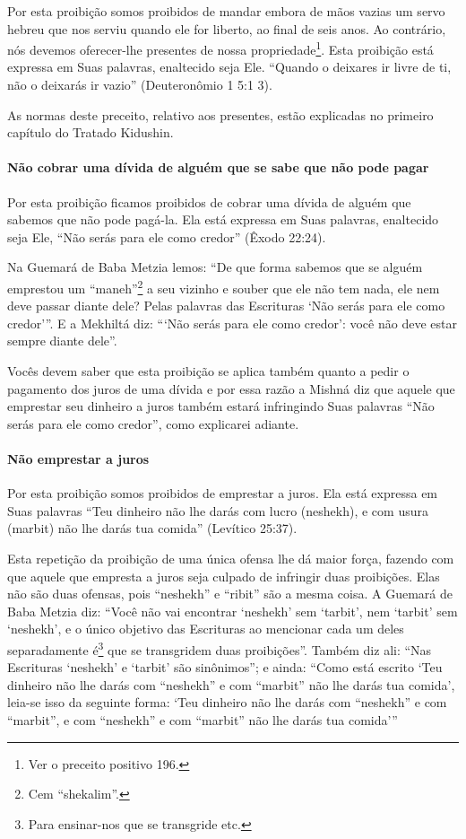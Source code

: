 Por esta proibição somos proibidos de mandar embora de mãos vazias um
servo hebreu que nos serviu quando ele for liberto, ao final de seis
anos. Ao contrário, nós devemos oferecer-lhe presentes de nossa
propriedade\footnote{Ver o preceito positivo 196.}. Esta proibição está expressa em Suas
palavras, enaltecido seja Ele. ``Quando o deixares ir livre de ti, não
o deixarás ir vazio'' (Deuteronômio 1 5:1 3).

As normas deste preceito, relativo aos presentes, estão explicadas no
primeiro capítulo do Tratado Kidushin.

\paragraph{Não cobrar uma dívida de alguém que se sabe que não pode pagar}

Por esta proibição ficamos proibidos de cobrar uma dívida de alguém que
sabemos que não pode pagá-la. Ela está expressa em Suas palavras,
enaltecido seja Ele, ``Não serás para ele como credor'' (Êxodo 22:24).

Na Guemará de Baba Metzia lemos: ``De que forma sabemos que se alguém
emprestou um ``maneh''\footnote{Cem ``shekalim''.} a seu vizinho e souber que
ele não tem nada, ele nem deve passar diante dele? Pelas palavras das
Escrituras `Não serás para ele como credor'''. E a Mekhiltá diz: ```Não
serás para ele como credor': você não deve estar sempre diante dele''.

Vocês devem saber que esta proibição se aplica também quanto a pedir o
pagamento dos juros de uma dívida e por essa razão a Mishná diz que
aquele que emprestar seu dinheiro a juros também estará infringindo Suas
palavras ``Não serás para ele como credor'', como explicarei adiante.

\paragraph{Não emprestar a juros}

Por esta proibição somos proibidos de emprestar a juros. Ela está
expressa em Suas palavras ``Teu dinheiro não lhe darás com lucro
(neshekh), e com usura (marbit) não lhe darás tua comida'' (Levítico
25:37).

Esta repetição da proibição de uma única ofensa lhe dá maior força,
fazendo com que aquele que empresta a juros seja culpado de infringir
duas proibições. Elas não são duas ofensas, pois ``neshekh'' e ``ribit''
são a mesma coisa. A Guemará de Baba Metzia diz: ``Você não vai
encontrar `neshekh' sem `tarbit', nem `tarbit' sem `neshekh', e o único
objetivo das Escrituras ao mencionar cada um deles separadamente
é\footnote{Para ensinar-nos que se transgride etc.} que se transgridem duas proibições''. Também diz
ali: ``Nas Escrituras `neshekh' e `tarbit' são sinônimos''; e ainda:
``Como está escrito `Teu dinheiro não lhe darás com ``neshekh'' e com
``marbit'' não lhe darás tua comida', leia-se isso da seguinte forma:
`Teu dinheiro não lhe darás com ``neshekh'' e com ``marbit'', e com
``neshekh'' e com ``marbit'' não lhe darás tua comida'''

